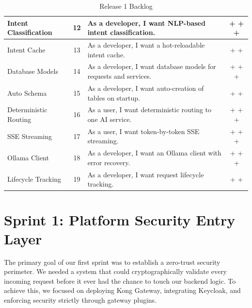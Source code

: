 \begin{table}[H]
\begin{tabularx}{\textwidth}{| >{\raggedright\arraybackslash}p{3.5cm} | c | >{\raggedright\arraybackslash}X | c |}
\hline
Intent Classification & 12 & As a developer, I want NLP-based intent classification. & + + + \\
\hline
Intent Cache & 13 & As a developer, I want a hot-reloadable intent cache. & + + \\
\hline
Database Models & 14 & As a developer, I want database models for requests and services. & + + + \\
\hline
Auto Schema & 15 & As a developer, I want auto-creation of tables on startup. & + + \\
\hline
Deterministic Routing & 16 & As a user, I want deterministic routing to one AI service. & + + + \\
\hline
SSE Streaming & 17 & As a user, I want token-by-token SSE streaming. & + + + \\
\hline
Ollama Client & 18 & As a developer, I want an Ollama client with error recovery. & + + + \\
\hline
Lifecycle Tracking & 19 & As a developer, I want request lifecycle tracking. & + + \\
\hline
\end{tabularx}
\caption{Release 1 Backlog}
\label{tab:release1_backlog}
\end{table}


\section{Sprint 1: Platform Security Entry Layer}

The primary goal of our first sprint was to establish a zero-trust security perimeter. We needed a system that could cryptographically validate every incoming request before it ever had the chance to touch our backend logic. To achieve this, we focused on deploying Kong Gateway, integrating Keycloak, and enforcing security strictly through gateway plugins.

